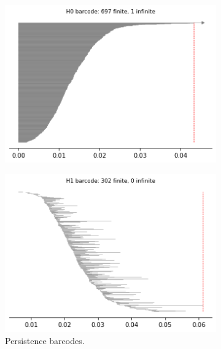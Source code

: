 \begin{figure}[H]
\begin{subfigure}[b]{0.25\textwidth}
\end{subfigure}
\begin{subfigure}[b]{0.24\textwidth}
    \includegraphics[width=\textwidth]{figures/X1_H0_barcode.png}
    \captionsetup{labelformat=empty}
    \caption{}
\end{subfigure}
\begin{subfigure}[b]{0.24\textwidth}
    \includegraphics[width=\textwidth]{figures/X1_H1_barcode.png}
        \caption*{Persistence barcodes.}
\end{subfigure}
\begin{subfigure}[b]{0.24\textwidth}

\end{subfigure}
\end{figure}
